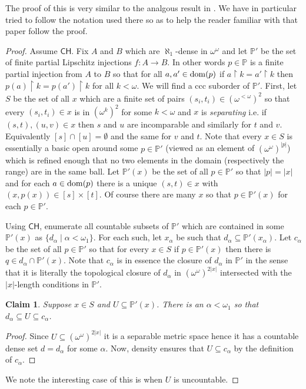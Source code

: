 \documentclass[leqno,11pt]{amsart}
\newtheorem{claim}[theorem]{Claim}
\theoremstyle{definition}
\theoremstyle{remark}
\def\hook{\upharpoonright}
\def\baire{\omega^\omega}
\def\CH {\mathsf{CH}}
\def\P{\mathbb P}
\begin{document}
The proof of this is very similar to the analgous result in \cite{Baum73}. We have in particular tried to follow the notation used there so as to help the reader familiar with that paper follow the proof. 
    \begin{proof}
    Assume $\CH$. Fix $A$ and $B$ which are $\aleph_1$-dense in $\baire$ and let $\P'$ be the set of finite partial Lipschitz injections $f:A \to B$. In other words $p \in \P$ is a finite partial injection from $A$ to $B$ so that for all $a, a' \in {\rm dom}(p)$ if $a \hook k = a' \hook k$ then $p(a) \hook k = p(a') \hook k$ for all $k < \omega$. We will find a ccc suborder of $\P'$. First, let $S$ be the set of all $x$ which are a finite set of pairs $(s_i, t_i) \in (\omega^{<\omega})^2$ so that every $(s_i, t_i) \in x$ is in $(\omega^k)^2$ for some $k < \omega$ and $x$ is {\em separating} i.e. if $(s, t), (u, v) \in x$ then $s$ and $u$ are incomparable and similarly for $t$ and $v$. Equivalently $[s] \cap [u] = \emptyset$ and the same for $v$ and $t$. Note that every $x \in S$ is essentially a basic open around some $p \in \P'$ (viewed as an element of $(\baire)^{|p|}$) which is refined enough that no two elements in the domain (respectively the range) are in the same ball. Let $\P'(x)$ be the set of all $p \in \P'$ so that $|p| = |x|$ and for each $a \in {\rm dom}(p)$ there is a unique $(s, t) \in x$ with $(x, p(x)) \in [s] \times [t]$. Of course there are many $x$ so that $p \in \P'(x)$ for each $p \in \P'$. 

    Using $\CH$, enumerate all countable subsets of $\P '$ which are contained in some $\P ' (x)$ as $\{d_\alpha \; | \; \alpha < \omega_1\}$. For each such, let $x_\alpha$ be such that $d_\alpha \subseteq \P'(x_\alpha)$. Let $c_\alpha$ be the set of all $p \in \P'$ so that for every $x \in S$ if $p \in \P'(x)$ then there is $q \in d_\alpha \cap \P'(x)$. Note that $c_\alpha$ is in essence the closure of $d_\alpha$ in $\P '$ in the sense that it is literally the topological closure of $d_\alpha$ in $(\baire)^{2|x|}$ intersected with the $|x|$-length conditions in $\P '$. 

    \begin{claim}
        Suppose $x \in S$ and $U \subseteq \P'(x)$. There is an $\alpha < \omega_1$ so that $d_\alpha \subseteq U \subseteq c_\alpha$. 
    \end{claim}

\begin{proof}
    Since $U \subseteq (\baire)^{2|x|}$ it is a separable metric space hence it has a countable dense set $d = d_\alpha$ for some $\alpha$. Now, density ensures that $U \subseteq c_\alpha$ by the definition of $c_\alpha$.  
    \end{proof}
We note the interesting case of this is when $U$ is uncountable. 


\end{proof}
\end{document}
